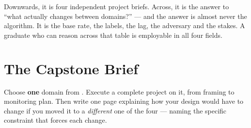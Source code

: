 \begin{conceptbox}
Downwards, it is four independent project briefs. Across, it is the answer to
``what actually changes between domains?'' --- and the answer is almost never the
algorithm. It is the base rate, the labels, the lag, the adversary and the stakes.
A graduate who can reason across that table is employable in all four fields.
\end{conceptbox}

\section{The Capstone Brief}

\begin{definitionbox}
Choose \textbf{one} domain from . Execute a complete project
on it, from framing to monitoring plan. Then write one page explaining how your
design would have to change if you moved it to a \emph{different} one of the four
--- naming the specific constraint that forces each change.
\end{definitionbox}

